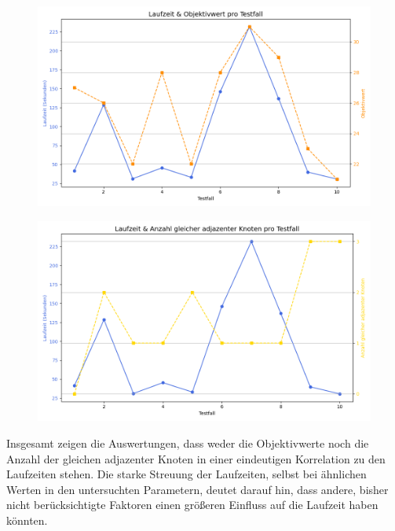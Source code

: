 \documentclass[bachelor, german]{algothesis}
\begin{document}
\begin{figure}[H]
    \centering
    \begin{minipage}{0.48\textwidth}
        \centering
        \includegraphics[width=\textwidth]{figures/LaufzeitObjektivwert10.png}
        \label{fig:LaufObj}
    \end{minipage}
    \hfill
    \begin{minipage}{0.48\textwidth}
        \centering
        \includegraphics[width=\textwidth]{figures/LaufzeitAdjNodes10.png}
        \label{fig:LaufAdj}
    \end{minipage}
\end{figure}
Insgesamt zeigen die Auswertungen, dass weder die Objektivwerte noch die Anzahl der gleichen adjazenter Knoten in einer eindeutigen Korrelation zu den Laufzeiten stehen. Die starke Streuung der Laufzeiten, selbst bei ähnlichen Werten in den untersuchten Parametern, deutet darauf hin, dass andere, bisher nicht berücksichtigte Faktoren einen größeren Einfluss auf die Laufzeit haben könnten.\newline 
\end{document}
